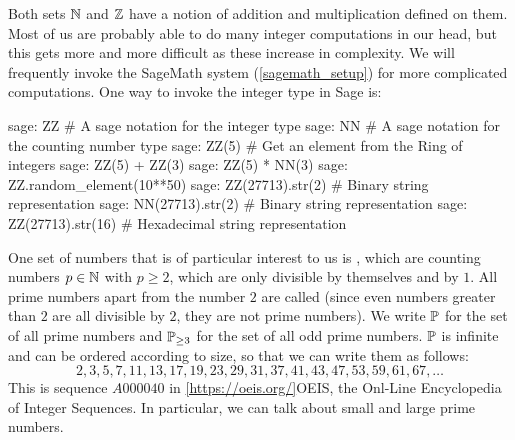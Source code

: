 Both sets $\mathbb{N}$ and $\mathbb{Z}$ have a notion of addition and multiplication defined on them. Most of us are probably able to do many integer computations in our head, but this gets more and more difficult as these increase in complexity.  We will frequently invoke the SageMath system (\ref{sagemath_setup}) for more complicated computations. One way to invoke the integer type in Sage is: 
\begin{sagecommandline}
sage: ZZ # A sage notation for the integer type
sage: NN # A sage notation for the counting number type
sage: ZZ(5) # Get an element from the Ring of integers
sage: ZZ(5) + ZZ(3)
sage: ZZ(5) * NN(3)
sage: ZZ.random_element(10**50)
sage: ZZ(27713).str(2) # Binary string representation
sage: NN(27713).str(2) # Binary string representation
sage: ZZ(27713).str(16) # Hexadecimal string representation
\end{sagecommandline}
One set of numbers that is of particular interest to us is , which are counting numbers $ p \in \mathbb{N} $ with $ p \geq 2 $, which are only divisible by themselves and by $ 1 $. All prime numbers apart from the number $ 2 $ are called  (since even numbers greater than $2$ are all divisible by $2$, they are not prime numbers). We write $ \mathbb{P} $ for the set of all prime numbers and $ \mathbb{P} _{\geq 3} $ for the set of all odd prime numbers.
$\mathbb{P}$ is infinite and can be ordered according to size, so that we can write them as follows:
\begin{equation}
\label{eq: primenumber_sequence}
2, 3, 5, 7, 11, 13, 17, 19, 23, 29, 31, 37, 41, 43, 47, 53, 59, 61, 67, \ldots
\end{equation}
This is sequence $ A000040 $ in \ref{https://oeis.org/}{OEIS}, the Onl-Line Encyclopedia of Integer Sequences. In particular, we can talk about small and large prime numbers.

